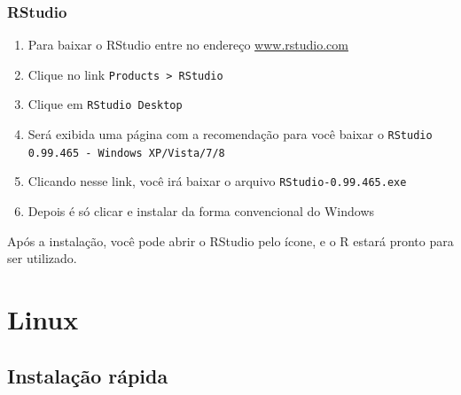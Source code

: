\documentclass[a4paper,12pt]{article}\usepackage[]{graphicx}\usepackage[]{color}
\providecommand{\R}{\textsf{R}\xspace}
\providecommand{\RStudio}{\textsf{RStudio}\xspace}
\begin{document}
\subsubsection{\RStudio}

\begin{enumerate}
\item Para baixar o \RStudio entre no endereço
  \url{www.rstudio.com}
\item Clique no link \texttt{Products > RStudio}
\item Clique em \texttt{RStudio Desktop}
\item Será exibida uma página com a recomendação para você baixar o
  \texttt{RStudio 0.99.465 - Windows XP/Vista/7/8}
\item Clicando nesse link, você irá baixar o arquivo
  \texttt{RStudio-0.99.465.exe}
\item Depois é só clicar e instalar da forma convencional do Windows
\end{enumerate}

Após a instalação, você pode abrir o \RStudio pelo ícone, e o \R estará
pronto para ser utilizado.

\section{Linux}

\subsection{Instalação rápida}
\label{sec:irl}
\end{document}
